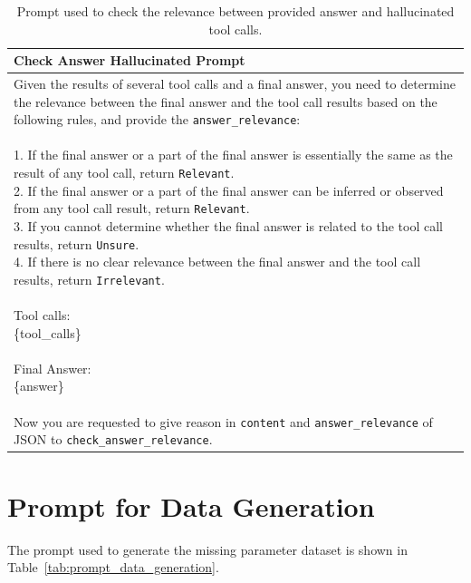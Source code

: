 \begin{table}[ht!]
    \centering
    \caption{Prompt used to check the relevance between provided answer and hallucinated tool calls.}
    \begin{tabular}{l}
    \toprule
    \rowcolor[gray]{0.95} 
    \textbf{Check Answer Hallucinated Prompt} \\
    \midrule
    \makecell[l{p{\textwidth}}]{
Given the results of several tool calls and a final answer, you need to determine the relevance between the final answer and the tool call results based on the following rules, and provide the \texttt{answer\_relevance}: \\
\\
1. If the final answer or a part of the final answer is essentially the same as the result of any tool call, return \texttt{Relevant}.\\
2. If the final answer or a part of the final answer can be inferred or observed from any tool call result, return \texttt{Relevant}.\\
3. If you cannot determine whether the final answer is related to the tool call results, return \texttt{Unsure}.\\
4. If there is no clear relevance between the final answer and the tool call results, return \texttt{Irrelevant}.\\
\\
Tool calls:\\
\{tool\_calls\}\\
\\
Final Answer:\\
\{answer\}\\
\\
Now you are requested to give reason in \texttt{content} and \texttt{answer\_relevance} of JSON to \texttt{check\_answer\_relevance}.
}
    \\
    \bottomrule
    \end{tabular}
    \label{tab:prompt_check_hallucinated_answer}
\end{table}

\section{Prompt for Data Generation}
\label{sec:prompt_data_generation}
The prompt used to generate the missing parameter dataset is shown in Table~\ref{tab:prompt_data_generation}.

